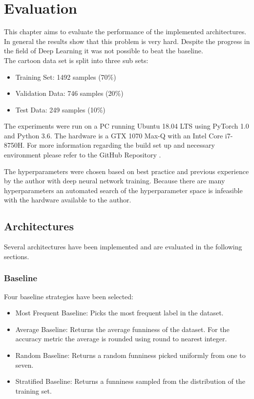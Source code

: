 \documentclass[draft,final,oneside]{vutinfth} %
\begin{document}
\chapter{Evaluation}

This chapter aims to evaluate the performance of the implemented architectures. In
general the results show that this problem is very hard. Despite the progress in the field of Deep Learning it was not possible to beat the baseline. \\

The cartoon data set is split into three sub sets:

\begin{itemize}
\item Training Set: 1492 samples (70\%)
\item Validation Data: 746 samples (20\%)
\item Test Data: 249 samples (10\%)
\end{itemize}

The experiments were run on a PC running Ubuntu 18.04 LTS using PyTorch 1.0 and
Python 3.6. The hardware is a GTX 1070 Max-Q with an Intel Core i7-8750H. For more
information regarding the build set up and necessary environment please refer to the GitHub Repository \cite{deephumorrepo}.

The hyperparameters were chosen based on best practice and previous
experience by the author with deep neural network training. Because there are many hyperparameters an automated search of the hyperparameter space is infeasible with the hardware available to the author.

\section{Architectures}
Several architectures have been implemented and are evaluated in the following sections.


\subsection{Baseline}

Four baseline strategies have been selected: 

\begin{itemize}

\item Most Frequent Baseline: Picks the most frequent label in the dataset.
\item Average Baseline: Returns the average funniness of the dataset. For the accuracy metric the average is rounded using round to nearest integer.
\item Random Baseline: Returns a random funniness picked uniformly from one to seven.
\item Stratified Baseline: Returns a funniness sampled from the distribution of the
training set.

\end{itemize}
\end{document}
